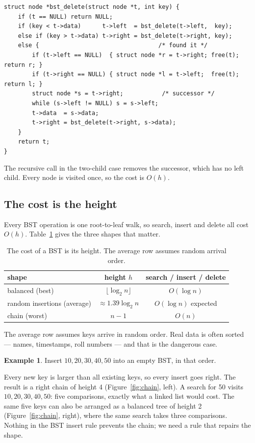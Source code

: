 \documentclass[11pt]{article}
\theoremstyle{definition}
\newtheorem{example}{Example}[section]
\begin{document}
\begin{verbatim}
struct node *bst_delete(struct node *t, int key) {
    if (t == NULL) return NULL;
    if (key < t->data)      t->left  = bst_delete(t->left,  key);
    else if (key > t->data) t->right = bst_delete(t->right, key);
    else {                                  /* found it */
        if (t->left == NULL)  { struct node *r = t->right; free(t); return r; }
        if (t->right == NULL) { struct node *l = t->left;  free(t); return l; }
        struct node *s = t->right;           /* successor */
        while (s->left != NULL) s = s->left;
        t->data  = s->data;
        t->right = bst_delete(t->right, s->data);
    }
    return t;
}
\end{verbatim}

The recursive call in the two-child case removes the successor, which has no
left child. Every node is visited once, so the cost is $O(h)$.

\subsection{The cost is the height}

Every BST operation is one root-to-leaf walk, so search, insert and delete
all cost $O(h)$. Table~\ref{tab:bstcost} gives the three shapes that matter.

\begin{table}[h]
  \centering
  {\footnotesize
  \begin{tabular}{l c c}
    \toprule
    \textbf{shape} & \textbf{height $h$} & \textbf{search / insert / delete} \\
    \midrule
    balanced (best) & $\lfloor \log_2 n\rfloor$ & $O(\log n)$ \\
    random insertions (average) & $\approx 1.39\log_2 n$ & $O(\log n)$ expected \\
    chain (worst) & $n-1$ & $O(n)$ \\
    \bottomrule
  \end{tabular}}
  \caption{The cost of a BST is its height. The average row assumes random
    arrival order.}
  \label{tab:bstcost}
\end{table}

The average row assumes keys arrive in random order. Real data is often
sorted --- names, timestamps, roll numbers --- and that is the dangerous case.

\begin{example}
Insert $10,20,30,40,50$ into an empty BST, in that order.

Every new key is larger than all existing keys, so every insert goes right.
The result is a right chain of height 4 (Figure~\ref{fig:chain}, left). A
search for 50 visits $10,20,30,40,50$: five comparisons, exactly what a
linked list would cost. The same five keys can also be arranged as a
balanced tree of height 2 (Figure~\ref{fig:chain}, right), where the same
search takes three comparisons. Nothing in the BST insert rule prevents the
chain; we need a rule that repairs the shape.
\end{example}
\end{document}
